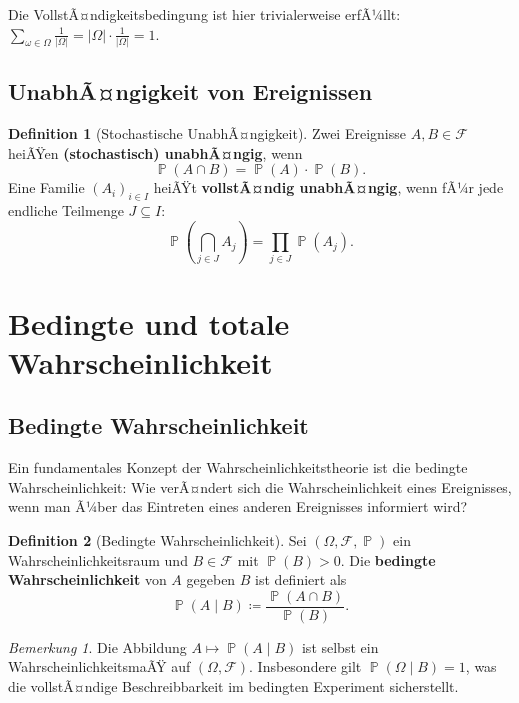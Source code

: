﻿\documentclass[12pt,a4paper]{article}
\theoremstyle{definition}
\newtheorem{definition}{Definition}[section]
\theoremstyle{plain}
\theoremstyle{remark}
\newtheorem{bemerkung}{Bemerkung}[section]
\DeclareMathOperator{\Prob}{\mathbb{P}}
\begin{document}
Die VollstÃ¤ndigkeitsbedingung ist hier trivialerweise erfÃ¼llt:
$\sum_{\omega\in\Omega} \frac{1}{|\Omega|} = |\Omega| \cdot \frac{1}{|\Omega|} = 1$.

\subsection{UnabhÃ¤ngigkeit von Ereignissen}

\begin{definition}[Stochastische UnabhÃ¤ngigkeit]\label{def:unabh}
  Zwei Ereignisse $A, B \in \mathcal{F}$ heiÃŸen \textbf{(stochastisch)
  unabhÃ¤ngig}, wenn
  \[
    \Prob(A \cap B) = \Prob(A) \cdot \Prob(B).
  \]
  Eine Familie $(A_i)_{i \in I}$ heiÃŸt \textbf{vollstÃ¤ndig unabhÃ¤ngig}, wenn
  fÃ¼r jede endliche Teilmenge $J \subseteq I$:
  \[
    \Prob\!\left(\bigcap_{j \in J} A_j\right) = \prod_{j \in J} \Prob(A_j).
  \]
\end{definition}

\section{Bedingte und totale Wahrscheinlichkeit}
\label{sec:bedingt}

\subsection{Bedingte Wahrscheinlichkeit}

Ein fundamentales Konzept der Wahrscheinlichkeitstheorie ist die bedingte
Wahrscheinlichkeit: Wie verÃ¤ndert sich die Wahrscheinlichkeit eines Ereignisses,
wenn man Ã¼ber das Eintreten eines anderen Ereignisses informiert wird?

\begin{definition}[Bedingte Wahrscheinlichkeit]\label{def:bedingteW}
  Sei $(\Omega, \mathcal{F}, \Prob)$ ein Wahrscheinlichkeitsraum und
  $B \in \mathcal{F}$ mit $\Prob(B) > 0$. Die \textbf{bedingte
  Wahrscheinlichkeit} von $A$ gegeben $B$ ist definiert als
  \[
    \Prob(A \mid B) \coloneqq \frac{\Prob(A \cap B)}{\Prob(B)}.
  \]
\end{definition}

\begin{bemerkung}
  Die Abbildung $A \mapsto \Prob(A \mid B)$ ist selbst ein WahrscheinlichkeitsmaÃŸ
  auf $(\Omega, \mathcal{F})$. Insbesondere gilt $\Prob(\Omega \mid B) = 1$, was
  die vollstÃ¤ndige Beschreibbarkeit im bedingten Experiment sicherstellt.
\end{bemerkung}
\end{document}
